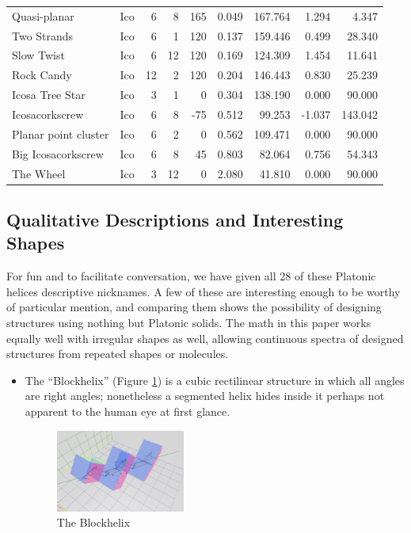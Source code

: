 \documentclass[11pt]{article}
\begin{document}
{\begin{table}[ht]
\begin{tabular}{l l r r r r r r r}
Quasi-planar & Ico &	6 &	8 &	165 &	0.049 &	167.764 & 1.294 & 4.347 \\
Two Strands & Ico &	6 &	1 &	120 &	0.137 &	159.446	& 0.499 & 28.340 \\
Slow Twist & Ico &	6 &	12 &	120 &	0.169 &	124.309	& 1.454	& 11.641 \\
Rock Candy & Ico &	12 &	2 &	120 &	0.204 &	146.443	& 0.830 & 25.239 \\
Icosa Tree Star & Ico &	3 &	1 &	0 &	0.304 &	138.190	& 0.000	& 90.000 \\
Icosacorkscrew & Ico &	6 &	8 &	-75 &	0.512 &	99.253	& -1.037 & 143.042 \\
Planar point cluster & Ico &	6 &	2 &	0 &	0.562 &	109.471 & 0.000 & 90.000 \\
Big Icosacorkscrew  & Ico &	6 &	8 &	45 &	0.803 &	82.064 & 0.756 & 54.343 \\
The Wheel & Ico &	3 &	12 &	0 &	2.080 &	41.810 & 0.000 & 90.000 \\
\hline %
\end{tabular}
\label{table:platonic} %
\end{table}

\subsection{Qualitative Descriptions and Interesting Shapes}

For fun and to facilitate conversation, we have given all
28 of these Platonic helices descriptive nicknames.
A few of these are interesting enough
to be worthy of particular mention, and comparing them
shows the possibility of designing structures using nothing but Platonic solids.
The math in this paper works equally well with irregular shapes as well,
allowing continuous spectra of designed structures from repeated shapes
or molecules.

\begin{itemize}
\item The ``Blockhelix'' (Figure \ref{fig:blockhelix}) is a cubic rectilinear structure in which all angles are right angles; nonetheless
  a segmented helix hides inside it perhaps not apparent to the human eye at first glance.
\begin{figure}
     \centering
     \includegraphics[width=0.40\textwidth]{figures/Blockhelix.png}
     \caption{The Blockhelix}
  \label{fig:blockhelix}
\end{figure}


\end{itemize}}
\end{document}
